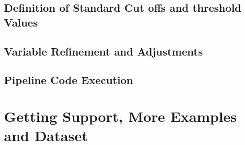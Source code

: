 \documentclass{article}
\begin{document}
\subsection{Definition of Standard Cut offs and threshold Values}
\subsection{Variable Refinement and Adjustments}
\subsection{Pipeline Code Execution }
\vspace{1em} %



\section{Getting Support, More Examples and Dataset}
\end{document}
